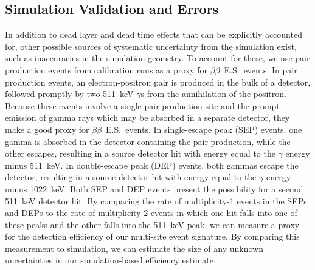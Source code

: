 \documentclass[notitlepage,rmp,aps,10pt]{revtex4-1}
\newcommand{\bb}{${\beta \beta}$}
\newcommand{\bbes}{\bb~E.S.}
\begin{document}
\subsection{Simulation Validation and Errors} \label{sec:Co56}
In addition to dead layer and dead time effects that can be explicitly accounted for, other possible sources of systematic uncertainty from the simulation exist, such as inaccuracies in the simulation geometry.
To account for these, we use pair production events from calibration runs as a proxy for \bbes\ events.
In pair production events, an electron-positron pair is produced in the bulk of a detector, followed promptly by two 511~keV $\gamma$s from the annihilation of the positron.
Because these events involve a single pair production site and the prompt emission of gamma rays which may be absorbed in a separate detector, they make a good proxy for \bbes\ events.
In single-escape peak (SEP) events, one gamma is absorbed in the detector containing the pair-production, while the other escapes, resulting in a source detector hit with energy equal to the $\gamma$ energy minus 511~keV.
In double-escape peak (DEP) events, both gammas escape the detector, resulting in a source detector hit with energy equal to the $\gamma$ energy minus 1022~keV.
Both SEP and DEP events present the possibility for a second 511~keV detector hit.
By comparing the rate of multiplicity-1 events in the SEPs and DEPs to the rate of multiplicity-2 events in which one hit falls into one of these peaks and the other falls into the 511~keV peak, we can measure a proxy for the detection efficiency of our multi-site event signature.
By comparing this measurement to simulation, we can estimate the size of any unknown uncertainties in our simulation-based efficiency estimate.
\end{document}
